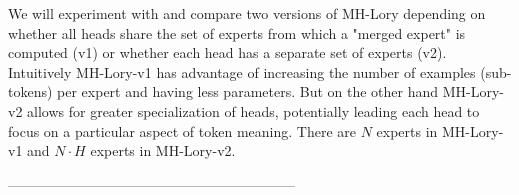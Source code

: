 \documentclass[12pt]{article}
\begin{document}
We will experiment with and compare two versions of MH-Lory depending on whether all heads share the set of experts from which a "merged expert" is computed (v1) or whether each head has a separate set of experts (v2). Intuitively MH-Lory-v1 has advantage of increasing the number of examples (sub-tokens) per expert and having less parameters. But on the other hand MH-Lory-v2 allows for greater specialization of heads, potentially leading each head to focus on a particular aspect of token meaning. There are $N$ experts in MH-Lory-v1 and $N \cdot H$ experts in MH-Lory-v2.






%


\printbibliography 
% 
--------------------------------------------------------------
 
\end{document}
